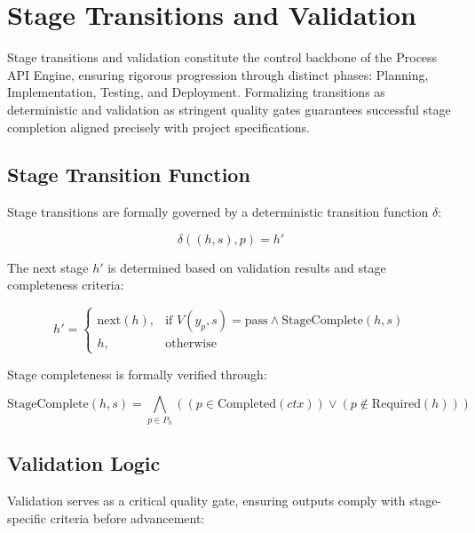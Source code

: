 \documentclass[11pt,a4paper]{article}
\begin{document}
\section{Stage Transitions and Validation}
\label{sec:stage_transitions}

Stage transitions and validation constitute the control backbone of the Process API Engine, ensuring rigorous progression through distinct phases: Planning, Implementation, Testing, and Deployment. Formalizing transitions as deterministic and validation as stringent quality gates guarantees successful stage completion aligned precisely with project specifications.

\subsection{Stage Transition Function}
\label{subsec:transition_function}

Stage transitions are formally governed by a deterministic transition function \( \delta \):

\[
\delta((h, s), p) = h'
\]

The next stage \( h' \) is determined based on validation results and stage completeness criteria:

\[
h' = 
\begin{cases}
    \text{next}(h), & \text{if } V(y_p, s)=\text{pass} \wedge \text{StageComplete}(h, s)\\[4pt]
    h, & \text{otherwise}
\end{cases}
\]

Stage completeness is formally verified through:

\[
\text{StageComplete}(h, s) = \bigwedge_{p \in P_h} \left((p \in \text{Completed}(ctx)) \lor (p \notin \text{Required}(h))\right)
\]

\subsection{Validation Logic}
\label{subsec:validation_logic}

Validation serves as a critical quality gate, ensuring outputs comply with stage-specific criteria before advancement:
\end{document}
